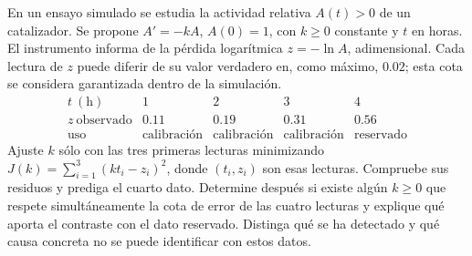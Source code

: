 En un ensayo simulado se estudia la actividad relativa \(A(t)>0\) de un catalizador. Se propone \(A'=-kA\), \(A(0)=1\), con \(k\ge0\) constante y \(t\) en horas. El instrumento informa de la pérdida logarítmica \(z=-\ln A\), adimensional. Cada lectura de \(z\) puede diferir de su valor verdadero en, como máximo, \(0.02\); esta cota se considera garantizada dentro de la simulación.
\[
\begin{array}{c|ccc|c}
t\ (\mathrm h)&1&2&3&4\\\hline
z\ \text{observado}&0.11&0.19&0.31&0.56\\
\text{uso}&\text{calibración}&\text{calibración}&\text{calibración}&\text{reservado}
\end{array}
\]
Ajuste \(k\) sólo con las tres primeras lecturas minimizando
\(J(k)=\sum_{i=1}^3(kt_i-z_i)^2\), donde \((t_i,z_i)\) son esas lecturas. Compruebe sus residuos y prediga el cuarto dato. Determine después si existe algún \(k\ge0\) que respete simultáneamente la cota de error de las cuatro lecturas y explique qué aporta el contraste con el dato reservado. Distinga qué se ha detectado y qué causa concreta no se puede identificar con estos datos.
